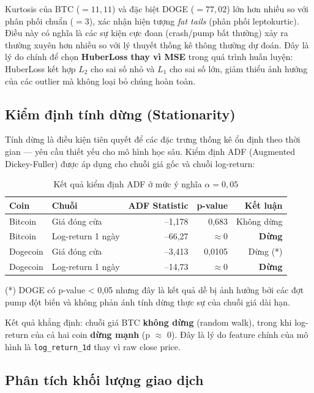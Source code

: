 \documentclass[12pt, a4paper]{report}
\begin{document}
Kurtosis của BTC ($= 11{,}11$) và đặc biệt DOGE ($= 77{,}02$) lớn hơn nhiều so với
phân phối chuẩn ($= 3$), xác nhận hiện tượng \textit{fat tails} (phân phối leptokurtic).
Điều này có nghĩa là các sự kiện cực đoan (crash/pump bất thường) xảy ra thường xuyên
hơn nhiều so với lý thuyết thống kê thông thường dự đoán. Đây là lý do chính để chọn
\textbf{HuberLoss thay vì MSE} trong quá trình huấn luyện: HuberLoss kết hợp $L_2$ cho
sai số nhỏ và $L_1$ cho sai số lớn, giảm thiểu ảnh hưởng của các outlier mà không loại
bỏ chúng hoàn toàn.

\subsection{Kiểm định tính dừng (Stationarity)}

Tính dừng là điều kiện tiên quyết để các đặc trưng thống kê ổn định theo thời gian ---
yêu cầu thiết yếu cho mô hình học sâu. Kiểm định ADF (Augmented Dickey-Fuller) được
áp dụng cho chuỗi giá gốc và chuỗi log-return:

\begin{table}[H]
  \centering
  \caption{Kết quả kiểm định ADF ở mức ý nghĩa $\alpha = 0{,}05$}
  \label{tab:adf}
  \begin{tabular}{llrrr}
    \toprule
    Coin & Chuỗi & ADF Statistic & p-value & Kết luận \\
    \midrule
    Bitcoin  & Giá đóng cửa   & --1,178 & 0,683   & Không dừng \\
    Bitcoin  & Log-return 1 ngày & --66,27 & $\approx 0$ & \textbf{Dừng} \\
    Dogecoin & Giá đóng cửa   & --3,413 & 0,0105  & Dừng (*) \\
    Dogecoin & Log-return 1 ngày & --14,73 & $\approx 0$ & \textbf{Dừng} \\
    \bottomrule
  \end{tabular}
  \begin{flushleft}
  \small (*) DOGE có p-value < 0,05 nhưng đây là kết quả dễ bị ảnh hưởng bởi các đợt pump
  đột biến và không phản ánh tính dừng thực sự của chuỗi giá dài hạn.
  \end{flushleft}
\end{table}

Kết quả khẳng định: chuỗi giá BTC \textbf{không dừng} (random walk), trong khi log-return
của cả hai coin \textbf{dừng mạnh} (p $\approx$ 0). Đây là lý do feature chính của mô hình
là \texttt{log\_return\_1d} thay vì raw close price.

\subsection{Phân tích khối lượng giao dịch}
\end{document}
